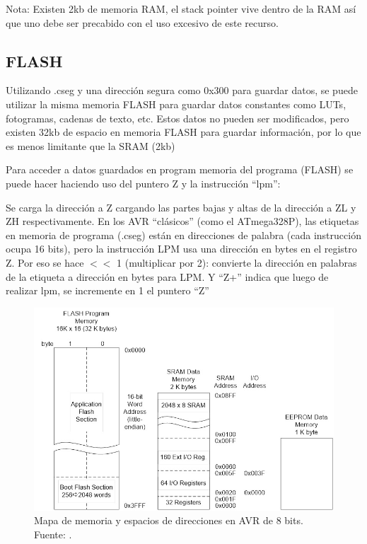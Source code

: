Nota: Existen 2kb de memoria RAM, el stack pointer vive dentro de la RAM así que uno debe ser precabido con el uso excesivo de este recurso.

\subsection{FLASH}


Utilizando .cseg y una dirección segura como 0x300 para guardar datos, se puede utilizar la misma memoria FLASH para guardar datos constantes como LUTs, fotogramas, cadenas de texto, etc. Estos datos no pueden ser modificados, pero existen 32kb de espacio en memoria FLASH para guardar información, por lo que es menos limitante que la SRAM (2kb)

Para acceder a datos guardados en program memoria del programa (FLASH) se puede hacer haciendo uso del puntero Z y la instrucción ``lpm'':



Se carga la dirección a Z cargando las partes bajas y altas de la dirección a ZL y ZH respectivamente. En los AVR  ``clásicos'' (como el ATmega328P), las etiquetas en memoria de programa (.cseg) están en direcciones de palabra (cada instrucción ocupa 16 bits), pero la instrucción LPM usa una dirección en bytes en el registro Z. Por eso se hace $<$$<$ 1 (multiplicar por 2): convierte la dirección en palabras de la etiqueta a dirección en bytes para LPM. Y ``Z+'' indica que luego de realizar lpm, se incremente en 1 el puntero ``Z''

\begin{figure}[H]
  \centering
  \includegraphics[width=\linewidth]{./Anexos/Memory Map.jpg}
  \caption{Mapa de memoria y espacios de direcciones en AVR de 8 bits. Fuente: \cite{arxterra_avr_addressing_modes}.}
  \label{fig:avr-memory-map}
\end{figure}


